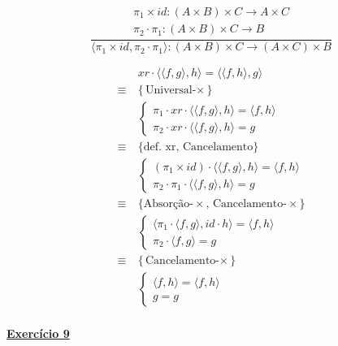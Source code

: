 \documentclass[a4paper,11pt]{article}
\begin{document}
	
	\[
	\frac{
		\begin{array}{c}
			\pi_1 \times id: (A \times B) \times C \rightarrow A \times C \\
			\pi_2 \cdot \pi_1: (A \times B) \times C \rightarrow B
		\end{array}
	}{
		\langle \pi_1 \times id, \pi_2 \cdot \pi_1 \rangle: (A \times B) \times C \rightarrow (A \times C) \times B
	}
	\]
	
	
	\[
	\begin{aligned}
		& xr \cdot \langle \langle f, g \rangle , h \rangle = \langle \langle f, h \rangle , g \rangle \\
		\equiv \  &\{\text{Universal-$\times$}\}\\
		&\begin{cases}
			\pi_1 \cdot xr \cdot \langle \langle f, g \rangle , h \rangle = \langle f, h \rangle \\
			\pi_2 \cdot xr \cdot \langle \langle f, g \rangle , h \rangle = g
		\end{cases}\\
		\equiv \  &\{\text{def. xr, Cancelamento}\}\\
		&\begin{cases}
			(\pi_1 \times id) \cdot \langle \langle f, g \rangle , h \rangle = \langle f, h \rangle \\
			\pi_2 \cdot \pi_1 \cdot \langle \langle f, g \rangle , h \rangle = g
		\end{cases}\\
		\equiv \  &\{\text{Absorção-$\times$, Cancelamento-$\times$}\}\\
		&\begin{cases}
			\langle \pi_1 \cdot \langle f, g \rangle, id \cdot h \rangle = \langle f, h \rangle \\
			\pi_2 \cdot \langle f, g \rangle = g
		\end{cases}\\
		\equiv \  &\{\text{Cancelamento-$\times$}\}\\
		&\begin{cases}
			\langle f, h \rangle = \langle f, h \rangle \\
			g = g
		\end{cases}\\
	\end{aligned}
	\]
	
	
	\newpage
	
	\noindent \underline{\textbf{Exercício 9}}\\
	
\end{document}
